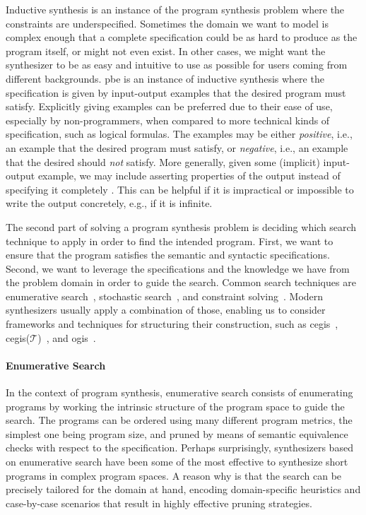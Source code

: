 Inductive synthesis is an instance of the program synthesis problem where the
constraints are underspecified.
Sometimes the domain we want to model is complex enough that a complete
specification could be as hard to produce as the program itself, or might not
even exist.
In other cases, we might want the synthesizer to be as easy and intuitive to use
as possible for users coming from different backgrounds.
\gls{pbe} is an instance of inductive synthesis where the specification is given
by input-output examples that the desired program must satisfy.
Explicitly giving examples can be preferred due to their ease of use, especially
by non-programmers, when compared to more technical kinds of specification, such
as logical formulas.
The examples may be either \textit{positive}, i.e., an example that the desired
program must satisfy, or \textit{negative}, i.e., an example that the desired
should \textit{not} satisfy.
More generally, given some (implicit) input-output example, we may include asserting
properties of the output instead of specifying it completely
\cite{Polozov:2015:FFI}.
This can be helpful if it is impractical or impossible
to write the output concretely, e.g., if it is infinite.


The second part of solving a program synthesis problem is deciding which search
technique to apply in order to find the intended program.
First, we want to ensure that the program satisfies the semantic and syntactic
specifications.
Second, we want to leverage the specifications and the knowledge we have from
the problem domain in order to guide the search.
Common search techniques are
enumerative search~\cite{Phothilimthana:2016:SUS,Alur:2017:SEP},
stochastic search~\cite{Schkufza:2013:SS,Singh:ranking:2015}, and
constraint solving~\cite{Feng:2018:PSU,Feng:2017:CST,Feng:2017:CSC}.
Modern synthesizers usually apply a combination of those, enabling us to
consider frameworks and techniques for structuring their construction, such as
\gls{cegis}~\cite{Solar-Lezama:2008},
\gls{cegis}($\mathcal{T}$)~\cite{Abate:2018:CMT}, and
\gls{ogis}~\cite{Jha:2017:TFS}.

\paragraph{Enumerative Search}
\label{sec:enumerative-search}

In the context of program synthesis, enumerative search consists of enumerating
programs by working the intrinsic structure of the program space to guide the
search.
The programs can be ordered using many different program metrics, the simplest
one being program size, and pruned by means of semantic equivalence checks with
respect to the specification.
Perhaps surprisingly, synthesizers based on enumerative search have been some of
the most effective to synthesize short programs in complex program spaces.
A reason why is that the search can be precisely tailored for the domain at
hand, encoding domain-specific heuristics and case-by-case scenarios that
result in highly effective pruning strategies.

